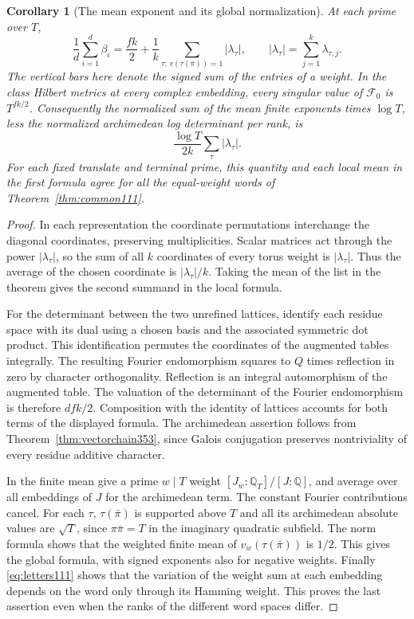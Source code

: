 \documentclass[a4paper,11pt]{article}
\newtheorem{corollary}[proposition]{Corollary}
\theoremstyle{definition}
\theoremstyle{remark}
\numberwithin{equation}{section}
\begin{document}
\begin{corollary}[The mean exponent and its global normalization]\leavevmode
\label{cor:fouriermean354}
At each prime over \(T\),
\[
       \frac1d\sum_{i=1}^d\beta_i
            =\frac{fk}{2}
                +\frac1k
                  \sum_{\tau:\,v(\tau(\bar\pi))=1}|\lambda_\tau|,
     \qquad |\lambda_\tau|=\sum_{j=1}^k\lambda_{\tau,j}.
\]
The vertical bars here denote the signed sum of the entries of
a weight. In the class Hilbert metrics at every complex
embedding, every singular value of \(\mathcal F_0\) is
\(T^{fk/2}\). Consequently the normalized sum of the mean
finite exponents times \(\log T\), less the normalized
archimedean log determinant per rank, is
\[
                 \frac{\log T}{2k}\sum_\tau|\lambda_\tau|.
\]
For each fixed translate and terminal prime, this quantity
and each local mean in the first formula agree for all the
equal-weight words of Theorem~\ref{thm:common111}.
\end{corollary}
\begin{proof}
In each representation the coordinate permutations interchange
the diagonal coordinates, preserving multiplicities. Scalar
matrices act through the power \(|\lambda_\tau|\), so the
sum of all \(k\) coordinates of every torus weight is
\(|\lambda_\tau|\). Thus the average of the chosen coordinate
is \(|\lambda_\tau|/k\). Taking the mean of the list in the
theorem gives the second summand in the local formula.

For the determinant between the two unrefined lattices,
identify each residue space with its dual using a chosen
basis and the associated symmetric dot product. This
identification permutes the coordinates of the augmented
tables integrally. The resulting Fourier endomorphism
squares to \(Q\) times reflection in zero by character
orthogonality. Reflection is an integral automorphism of
the augmented table. The valuation of the determinant of
the Fourier endomorphism is therefore \(d fk/2\). Composition
with the identity of lattices accounts for both terms of
the displayed formula. The archimedean assertion follows
from Theorem~\ref{thm:vectorchain353}, since Galois conjugation
preserves nontriviality of every residue additive character.

In the finite mean give a prime \(w\mid T\) weight
\([J_w:\mathbb Q_T]/[J:\mathbb Q]\), and average over all
embeddings of \(J\) for the archimedean term. The constant
Fourier contributions cancel. For each \(\tau\),
\(\tau(\bar\pi)\) is supported above \(T\) and all its
archimedean absolute values are \(\sqrt T\), since
\(\pi\bar\pi=T\) in the imaginary quadratic subfield.
The norm formula shows that the weighted finite mean of
\(v_w(\tau(\bar\pi))\) is \(1/2\). This gives the global
formula, with signed exponents also for negative weights.
Finally \eqref{eq:letters111} shows that the variation of the
weight sum at each embedding depends on the word only through
its Hamming weight. This proves the last assertion even when
the ranks of the different word spaces differ.
\end{proof}
\end{document}
